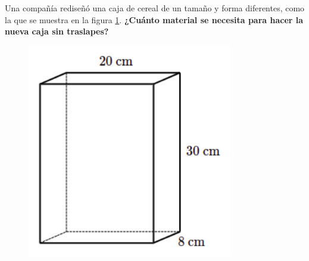 \question[10] Una compañía rediseñó una caja de cereal de un tamaño y forma diferentes,
como la que se muestra en la figura \ref{fig:prob_verb_superficie_04}.
\textbf{¿Cuánto material se necesita para hacer la nueva caja sin traslapes?}

\begin{minipage}{0.3\linewidth}
    \begin{figure}[H]
        \begin{center}
            \includegraphics[width=0.8\textwidth]{../images/prob_verb_superficie_04}
        \end{center}
        \caption{}
        \label{fig:prob_verb_superficie_04}
    \end{figure}
\end{minipage}
\begin{minipage}{0.7\linewidth}
\end{minipage}